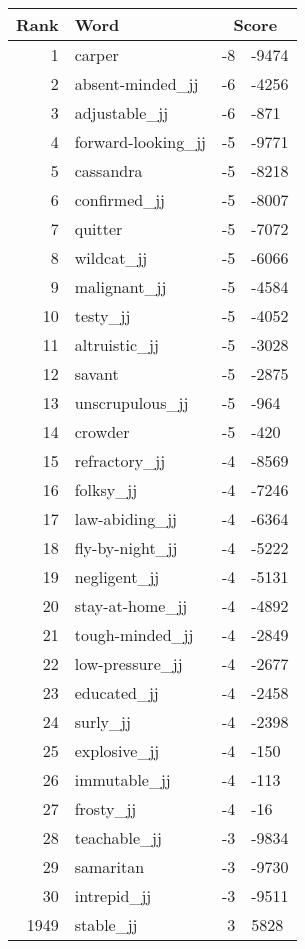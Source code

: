 \begin{longtable}[!htbp]{| rlr@{.}l |}
    \hline
    \textbf{Rank} & \textbf{Word} & \multicolumn{2}{c|}{\textbf{Score}} \\
    \hline
    \endhead
    1 & carper & -8 & -9474 \\
    2 & absent-minded\_jj & -6 & -4256 \\
    3 & adjustable\_jj & -6 & -871 \\
    4 & forward-looking\_jj & -5 & -9771 \\
    5 & cassandra & -5 & -8218 \\
    6 & confirmed\_jj & -5 & -8007 \\
    7 & quitter & -5 & -7072 \\
    8 & wildcat\_jj & -5 & -6066 \\
    9 & malignant\_jj & -5 & -4584 \\
    10 & testy\_jj & -5 & -4052 \\
    11 & altruistic\_jj & -5 & -3028 \\
    12 & savant & -5 & -2875 \\
    13 & unscrupulous\_jj & -5 & -964 \\
    14 & crowder & -5 & -420 \\
    15 & refractory\_jj & -4 & -8569 \\
    16 & folksy\_jj & -4 & -7246 \\
    17 & law-abiding\_jj & -4 & -6364 \\
    18 & fly-by-night\_jj & -4 & -5222 \\
    19 & negligent\_jj & -4 & -5131 \\
    20 & stay-at-home\_jj & -4 & -4892 \\
    21 & tough-minded\_jj & -4 & -2849 \\
    22 & low-pressure\_jj & -4 & -2677 \\
    23 & educated\_jj & -4 & -2458 \\
    24 & surly\_jj & -4 & -2398 \\
    25 & explosive\_jj & -4 & -150 \\
    26 & immutable\_jj & -4 & -113 \\
    27 & frosty\_jj & -4 & -16 \\
    28 & teachable\_jj & -3 & -9834 \\
    29 & samaritan & -3 & -9730 \\
    30 & intrepid\_jj & -3 & -9511 \\
    1949 & stable\_jj & 3 & 5828 \\

\end{longtable}

